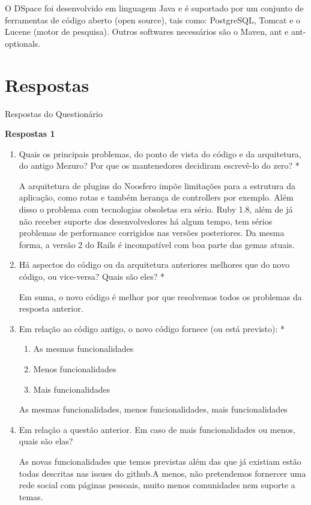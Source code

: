 O DSpace foi desenvolvido em linguagem Java e é suportado por um conjunto de ferramentas de código aberto (open source), tais como: PostgreSQL, Tomcat e o Lucene (motor de pesquisa). Outros softwares necessários são o Maven, ant e ant-optionals.

\newpage
\section{Respostas}
\label{resp-pesquisa}

{\large Respostas do Questionário}

\textbf{Respostas 1}

\begin{enumerate}
\item Quais os principais problemas, do ponto de vista do código e da arquitetura, do antigo Mezuro? Por que os mantenedores decidiram escrevê-lo do zero? *
  \begin{mdframed}
A arquitetura de plugins do Noosfero impõe limitações para a estrutura da aplicação, como rotas e também herança de controllers por exemplo. Além disso o problema com tecnologias obsoletas era sério. Ruby 1.8, além de já não receber suporte dos desenvolvedores há algum tempo, tem sérios problemas de performance corrigidos nas versões posteriores. Da mesma forma, a versão 2 do Rails é incompatível com boa parte das gemas atuais.
  \end{mdframed}
\item Há aspectos do código ou da arquitetura anteriores melhores que do novo código, ou vice-versa? Quais são eles? *
  \begin{mdframed}
Em suma, o novo código é melhor por que resolvemos todos os problemas da resposta anterior.
  \end{mdframed}
\item Em relação ao código antigo, o novo código fornece (ou está previsto): *
  \begin{enumerate}
  \item As mesmas funcionalidades
  \item Menos funcionalidades
  \item Mais funcionalidades 
  \end{enumerate}
    \begin{mdframed}
    As mesmas funcionalidades, menos funcionalidades, mais funcionalidades
    \end{mdframed}
\item Em relação a questão anterior. Em caso de mais funcionalidades ou menos, quais são elas? 
  \begin{mdframed}
As novas funcionalidades que temos previstas além das que já existiam estão todas descritas nas issues do github.A menos, não pretendemos fornercer uma rede social com páginas pessoais, muito menos comunidades nem suporte a temas.
  \end{mdframed}
\end{enumerate}

